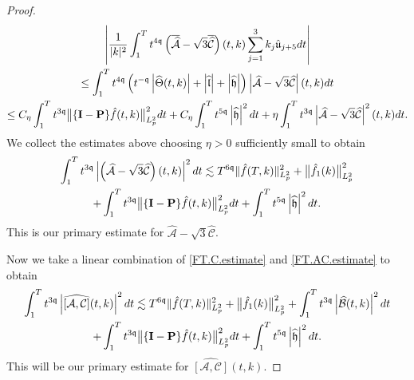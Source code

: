 \documentclass[reqno]{amsart}
\newcommand{\pv}{p}
\def\norm#1{\big\Vert#1\big\Vert}
\newcommand{\qq}{\mathfrak{q}}
\newcommand{\tmq}{t^{-\qq}}
\newcommand{\tTq}{t^{3\qq}}
\newcommand{\micro}{{\bf \{I- P\}}}
\newcommand{\highG}{\Theta}
\theoremstyle{definition}
\numberwithin{equation}{section}
\numberwithin{theorem}{section}
\begin{document}
\begin{proof}
\begin{multline*}
\left|  \frac{1}{|k|^2} 
\int_1^{T} t^{4\qq}\left( \overline{\widehat{\mathcal{A}}}- \sqrt{3}\overline{\widehat{\mathcal{C}}}\right)(t,k)  \sum_{j=1}^3 k_j\hat{\mathfrak{u}}_{j+5} dt
 \right|
\\
\leq
\int_1^{T}
 t^{4\qq}\left( \tmq\left|\widehat{\highG}(t,k)\right|+\left| \widehat{\mathfrak{l}}\right|+\left| \widehat{\mathfrak{h}}\right|\right) \left|{\widehat{\mathcal{A}}}- \sqrt{3}{\widehat{\mathcal{C}}}\right|(t,k) dt
\\
\leq
C_\eta\int_1^{T} \tTq\norm{\micro \hat{f}(t,k)}_{L^2_{\pv}}^2dt
  +
  C_\eta\int_1^{T} t^{5\qq}\left| \widehat{\mathfrak{h}}\right|^2dt
+
\eta \int^{T}_{1} \tTq \left|{\widehat{\mathcal{A}}}- \sqrt{3}{\widehat{\mathcal{C}}}\right|^2(t,k) dt. 
\end{multline*}
We collect the estimates above choosing $\eta>0$ sufficiently small to obtain
\begin{multline}\label{FT.AC.estimate}
\int_1^{T} \tTq\left|\left( {\widehat{\mathcal{A}}}- \sqrt{3}{\widehat{\mathcal{C}}}\right)(t,k)\right|^2  dt
\lesssim
 T^{6\qq}\Vert \hat{f}(T,k)\Vert_{L^2_{\pv}}^2+\norm{ \hat{f}_1(k)}_{L^2_{\pv}}^2
 \\
 +
\int_1^{T} \tTq\norm{\micro \hat{f}(t,k)}_{L^2_{\pv}}^2dt
+
\int_1^{T} t^{5\qq}\left| \widehat{\mathfrak{h}}\right|^2dt.
\end{multline}
This is our primary estimate for ${\widehat{\mathcal{A}}}- \sqrt{3}{\widehat{\mathcal{C}}}$.



Now we take a linear combination of \eqref{FT.C.estimate} and \eqref{FT.AC.estimate} to obtain 
\begin{multline}\label{FT.ACt.estimate}
    \int^{T}_{1} \tTq \left|\widehat{[\mathcal{A},\mathcal{C}]}(t,k)\right|^2 dt
    \lesssim
     T^{6\qq}\Vert \hat{f}(T,k)\Vert_{L^2_{\pv}}^2+\norm{ \hat{f}_1(k)}_{L^2_{\pv}}^2
  +
 \int^{T}_{1} \tTq \left|\widehat{{\mathcal{B}}}(t,k)\right|^2 dt 
 \\
+\int_1^{T} \tTq\norm{\micro \hat{f}(t,k)}_{L^2_{\pv}}^2dt
+\int_1^{T} t^{5\qq}\left| \widehat{\mathfrak{h}}\right|^2dt.
\end{multline}
This will be our primary estimate for $\widehat{[\mathcal{A},\mathcal{C}]}(t,k)$.







\end{proof}
\end{document}
